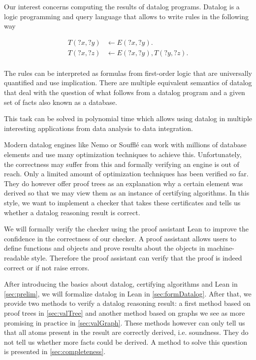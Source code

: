 Our interest concerns computing the results of datalog programs. Datalog is a logic programming and query language that allows to write rules in the following way

\begin{equation}
    \begin{split}
        T(?x, ?y) &\leftarrow E(?x, ?y). \\
        T(?x, ?z) &\leftarrow E(?x, ?y), T(?y, ?z). \\
    \end{split}
\end{equation}

The rules can be interpreted as formulas from first-order logic that are universally quantified and use implication. There are multiple equivalent semantics of datalog that deal with the question of what follows from a datalog program and a given set of facts also known as a database.

This task can be solved in polynomial time which allows using datalog in multiple interesting applications from data analysis\cite{dataAnalysis} to data integration\cite{dataInt}.

Modern datalog engines like Nemo\cite{Nemo} or Soufflé\cite{Souffle} can work with millions of database elements and use many optimization techniques to achieve this. Unfortunately, the correctness may suffer from this and formally verifying an engine is out of reach. Only a limited amount of optimization techniques has been verified so far\cite{datalogOptimizationsCoq}. They do however offer proof trees as an explanation why a certain element was derived so that we may view them as an instance of certifying algorithms. In this style, we want to implement a checker that takes these certificates and tells us whether a datalog reasoning result is correct.

We will formally verify the checker using the proof assistant Lean\cite{Lean4} to improve the confidence in the correctness of our checker. A proof assistant allows users to define functions and objects and prove results about the objects in machine-readable style. Therefore the proof assistant can verify that the proof is indeed correct or if not raise errors.

After introducing the basics about datalog, certifying algorithms and Lean in \cref{sec:prelim}, we will formalize datalog in Lean in \cref{sec:formDatalog}. After that, we provide two methods to verify a datalog reasoning result: a first method based on proof trees in \cref{sec:valTree} and another method based on graphs we see as more promising in practice in \cref{sec:valGraph}. 
These methods however can only tell us that all atoms present in the result are correctly derived, i.e. soundness. They do not tell us whether more facts could be derived. A method to solve this question is presented in \cref{sec:completeness}.


